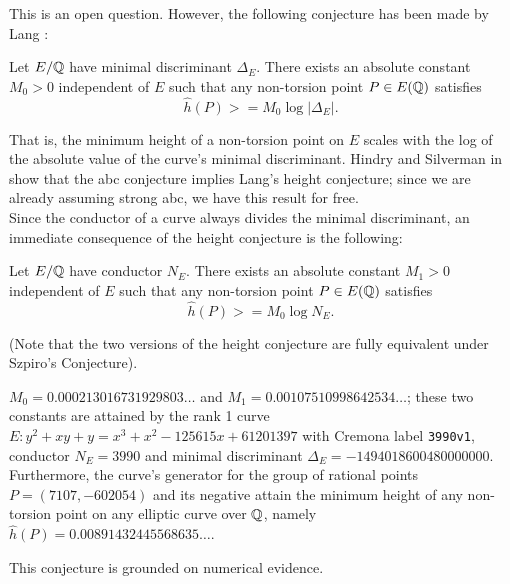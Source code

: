\documentclass[10pt]{article}
\begin{document}
This is an open question. However, the following conjecture has been made by Lang \cite{Lang-1997}:

\begin{conjecture}
Let $E/\mathbb{Q}$ have minimal discriminant $\Delta_E$. There exists an absolute constant $M_0 >0$ independent of $E$ such that any non-torsion point $P \in E(\mathbb{Q})$ satisfies
\begin{equation}
\hat{h}(P) >= M_0 \log |\Delta_E| .
\end{equation}
\end{conjecture}
That is, the minimum height of a non-torsion point on $E$ scales with the log of the absolute value of the curve's minimal discriminant. Hindry and Silverman in \cite{HiS-1988} show that the abc conjecture implies Lang's height conjecture; since we are already assuming strong abc, we have this result for free. \\

Since the conductor of a curve always divides the minimal discriminant, an immediate consequence of the height conjecture is the following:
\begin{corollary}
Let $E/\mathbb{Q}$ have conductor $N_E$. There exists an absolute constant $M_1 >0$ independent of $E$ such that any non-torsion point $P \in E(\mathbb{Q})$ satisfies
\begin{equation}
\hat{h}(P) >= M_0 \log N_E .
\end{equation}
\end{corollary}
(Note that the two versions of the height conjecture are fully equivalent under Szpiro's Conjecture). \\

\begin{conjecture}
$M_0 = 0.000213016731929803\ldots$ and $M_1 = 0.00107510998642534\ldots$; these two constants are attained by the rank 1 curve $E: y^2+xy+y=x^3+x^2-125615x+61201397$ with Cremona label {\tt 3990v1}, conductor $N_E = 3990$ and minimal discriminant $\Delta_E = -1494018600480000000$. Furthermore, the curve's generator for the group of rational points $P = (7107,-602054)$ and its negative attain the minimum height of any non-torsion point on any elliptic curve over $\mathbb{Q}$, namely $\hat{h}(P) = 0.00891432445568635\ldots$.
\end{conjecture}
This conjecture is grounded on numerical evidence. 
\end{document}

